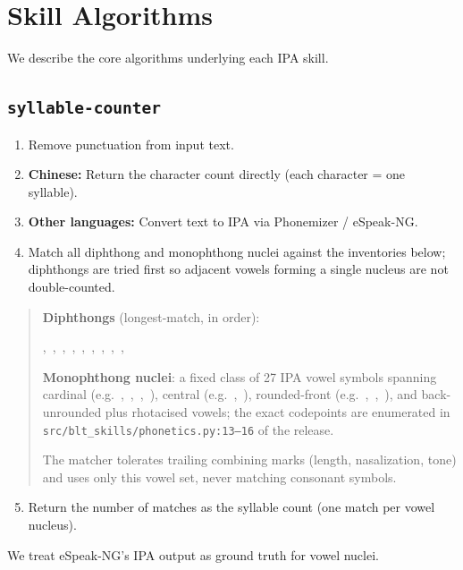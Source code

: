 \documentclass[11pt]{article}
\begin{document}
\section{Skill Algorithms}
\label{app:tools}

We describe the core algorithms underlying each IPA skill.

\subsection{\texttt{syllable-counter}}

\begin{enumerate}
    \item Remove punctuation from input text.
    \item \textbf{Chinese:} Return the character count directly (each character = one syllable).
    \item \textbf{Other languages:} Convert text to IPA via Phonemizer / eSpeak-NG.
    \item Match all diphthong and monophthong nuclei against the inventories below; diphthongs are tried first so adjacent vowels forming a single nucleus are not double-counted.
\end{enumerate}
\begin{quote}
\small
\textbf{Diphthongs} (longest-match, in order):\par
{},\ ,\ ,\ ,\ ,\ ,\ ,\ ,\ ,\ \par
\smallskip
\textbf{Monophthong nuclei}: a fixed class of 27 IPA vowel symbols spanning cardinal (e.g.\ ,\ ,\ ,\ ), central (e.g.\ ,\ ), rounded-front (e.g.\ ,\ \textipa{\o},\ \textipa{\oe}), and back-unrounded plus rhotacised vowels; the exact codepoints are enumerated in \texttt{src/blt\_skills/phonetics.py:13--16} of the release.\par
\smallskip
The matcher tolerates trailing combining marks (length, nasalization, tone) and uses only this vowel set, never matching consonant symbols.
\end{quote}
\begin{enumerate}
    \setcounter{enumi}{4}
    \item Return the number of matches as the syllable count (one match per vowel nucleus).
\end{enumerate}
We treat eSpeak-NG's IPA output as ground truth for vowel nuclei.
\end{document}
